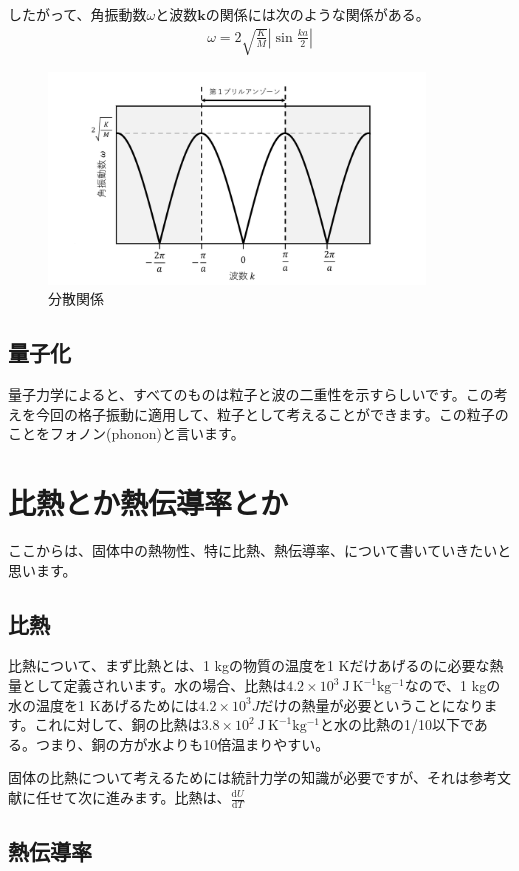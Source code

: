 \documentclass[10pt,b5paper,papersize,dvipdfmx]{jsbook}
\begin{document}
したがって、角振動数$\omega$と波数$\bm{k}$の関係には次のような関係がある。
\begin{align}
  \omega = 2 \sqrt{\frac{K}{M}} \left| \sin \frac{ka}{2}\right|
\end{align}
\begin{figure}[htbp]
  \centering
  \includegraphics[width=10cm]{img/bunsann.pdf}  %
  \caption{分散関係}
  \label{fig:bane}
\end{figure}

\subsection{量子化}
量子力学によると、すべてのものは粒子と波の二重性を示すらしいです。この考えを今回の格子振動に適用して、粒子として考えることができます。この粒子のことをフォノン(phonon)と言います。



\section{比熱とか熱伝導率とか}
ここからは、固体中の熱物性、特に比熱、熱伝導率、について書いていきたいと思います。
\subsection{比熱}
比熱について、まず比熱とは、1 kgの物質の温度を1 Kだけあげるのに必要な熱量として定義されいます。水の場合、比熱は$4.2 \times 10^3\  \mathrm{J\ K ^{-1} kg^{-1}}$なので、1 kgの水の温度を1 Kあげるためには$4.2 \times 10^3 J$だけの熱量が必要ということになります。これに対して、銅の比熱は$3.8 \times 10^2\ \mathrm{J\ K ^{-1} kg^{-1}}$と水の比熱の1/10以下である。つまり、銅の方が水よりも10倍温まりやすい。\par
固体の比熱について考えるためには統計力学の知識が必要ですが、それは参考文献に任せて次に進みます。比熱は、$\frac{\mathrm{d}U}{\mathrm{d}T}$
\subsection{熱伝導率}
\end{document}
